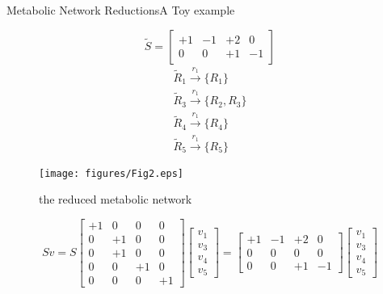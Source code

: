 \documentclass[10pt]{beamer}
\theoremstyle{remark}
\theoremstyle{definition}
\begin{document}
\begin{frame}{Metabolic Network Reductions}{A Toy example}
\noindent
\begin{minipage}[t]{.49\textwidth}
\raggedright
\[
\tilde{S} = \left[
\begin{array}{cccc}
+1 & -1 & +2 & 0\\
0 & 0 & +1 & -1
\end{array}
\right]
\]
\[
\begin{array}{l}
\tilde{R}_1 \xrightarrow{r_1} \{R_1\} \\
\tilde{R}_3 \xrightarrow{r_1} \{R_2, R_3\} \\
\tilde{R}_4 \xrightarrow{r_1} \{R_4\} \\
\tilde{R}_5 \xrightarrow{r_1} \{R_5\}
\end{array}
\]
\end{minipage}
\hfill
\begin{minipage}[t]{.49\textwidth}
\raggedleft
\begin{figure}[ht]%
    \centering
    \texttt{[image: figures/Fig2.eps]}
    \caption{the reduced metabolic network}
\end{figure}
\end{minipage}\pause
\[
Sv = S \left[
\begin{array}{cccc}
+1 & 0 & 0 & 0\\
0 & +1 & 0 & 0\\
0 & +1 & 0 & 0\\
0 & 0 & +1 & 0\\
0 & 0 & 0 & +1
\end{array}
\right]\left[
\begin{array}{c}
v_1\\
v_3\\
v_4\\
v_5
\end{array}
\right] = \left[
\begin{array}{cccc}
+1 & -1 & +2 & 0\\
0 & 0 & 0 & 0\\
0 & 0 & +1 & -1
\end{array}
\right]\left[
\begin{array}{c}
v_1\\
v_3\\
v_4\\
v_5
\end{array}
\right]
\]
\end{frame}
\end{document}
